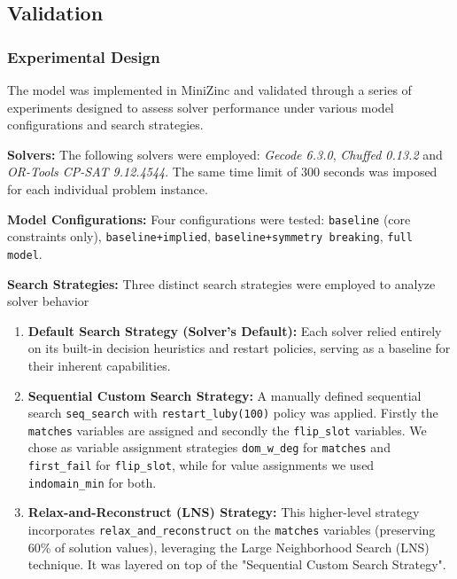 \subsection{Validation}

\subsubsection{Experimental Design}

The model was implemented in MiniZinc and validated through a series of experiments designed to assess solver performance under various model configurations and search strategies.

\textbf{Solvers:}
The following solvers were employed: \textit{Gecode 6.3.0}, \textit{Chuffed 0.13.2} and \textit{OR-Tools CP-SAT 9.12.4544}. 
The same time limit of $300$ seconds was imposed for each individual problem instance.

\textbf{Model Configurations:}
Four configurations were tested: \texttt{baseline} (core constraints only), \texttt{baseline+implied}, \texttt{baseline+symmetry breaking}, \texttt{full model}.

\textbf{Search Strategies:}
Three distinct search strategies were employed to analyze solver behavior

\begin{enumerate}
    \item \textbf{Default Search Strategy (Solver's Default):} Each solver relied entirely on its built-in decision heuristics and restart policies, serving as a baseline for their inherent capabilities.

    \item \textbf{Sequential Custom Search Strategy:} A manually defined sequential search \texttt{seq\_search} with \texttt{restart\_luby(100)} policy was applied. 
    Firstly the \texttt{matches} variables  are assigned and secondly the \texttt{flip\_slot} variables. 
    We chose as variable assignment strategies \texttt{dom\_w\_deg} for \texttt{matches} and \texttt{first\_fail} for \texttt{flip\_slot}, while for value assignments we used \\\texttt{indomain\_min} for both.

    \item \textbf{Relax-and-Reconstruct (LNS) Strategy:} This higher-level strategy incorporates \texttt{relax\_and\_reconstruct} on the \texttt{matches} variables (preserving 60\% of solution values), leveraging the Large Neighborhood Search (LNS) technique. It was layered on top of the "Sequential Custom Search Strategy".
\end{enumerate}

